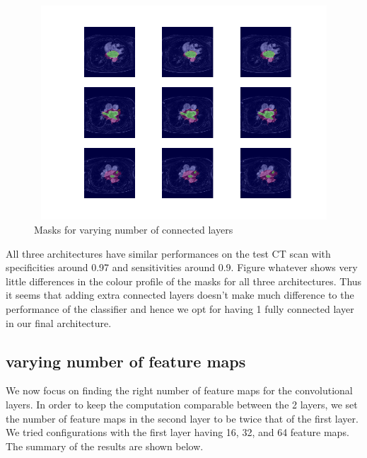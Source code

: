 \begin{figure}
\centering
\includegraphics[trim=2.5cm 1.5cm 2cm 1.5cm, clip=true, height=80mm, width=150mm]{Chapter3/mask_results_varying_number_of_connected_layers.png}
\caption{Masks for varying number of connected layers}
\end{figure}

\noindent All three architectures have similar performances on the test CT scan with specificities around 0.97 and sensitivities around 0.9. Figure whatever shows very little differences in the colour profile of the masks for all three architectures. Thus it seems that adding extra connected layers doesn't make much difference to the performance of the classifier and hence we opt for having 1 fully connected layer in our final architecture.

\subsection{varying number of feature maps}

\noindent We now focus on finding the right number of feature maps for the convolutional layers. In order to keep the computation comparable between the 2 layers, we set the number of feature maps in the second layer to be twice that of the first layer. We tried configurations with the first layer having 16, 32, and 64 feature maps. The summary of the results are shown below.\\

